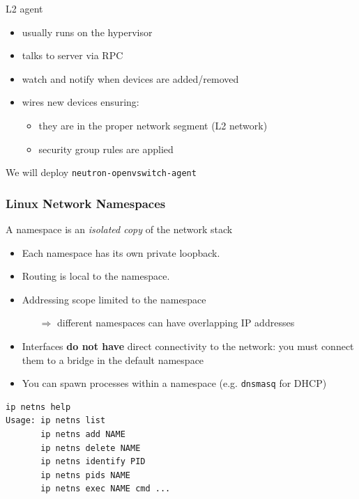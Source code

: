 \documentclass[english,serif,mathserif,xcolor=pdftex,dvipsnames,table]{beamer}
\begin{document}
\begin{frame}
  {L2 agent}
  \begin{itemize}
  \item usually runs on the hypervisor
  \item talks to server via RPC
  \item watch and notify when devices are added/removed
  \item wires new devices ensuring:
    \begin{itemize}
    \item they are in the proper network segment (L2 network)
    \item security group rules are applied
    \end{itemize}
  \end{itemize}

  \vspace{1em}
  We will deploy \texttt{neutron-openvswitch-agent}
\end{frame}



\begin{frame}[fragile]
  \frametitle{Linux Network Namespaces}
A namespace is an \textit{isolated copy} of the network stack

\begin{itemize}
\item Each namespace has its own private loopback.
\item Routing is local to the namespace.
\item Addressing scope limited to the namespace
  \begin{itemize}
  \item[$\Rightarrow$] different namespaces can have overlapping IP addresses
  \end{itemize}
\item Interfaces \textbf{do not have} direct connectivity to the
  network: you must connect them to a bridge in the default namespace
\item You can spawn processes within a namespace
  (e.g. \texttt{dnsmasq} for DHCP)
\end{itemize}

\footnotesize
\begin{verbatim}
ip netns help
Usage: ip netns list
       ip netns add NAME
       ip netns delete NAME
       ip netns identify PID
       ip netns pids NAME
       ip netns exec NAME cmd ...
\end{verbatim}
\end{frame}
\end{document}
